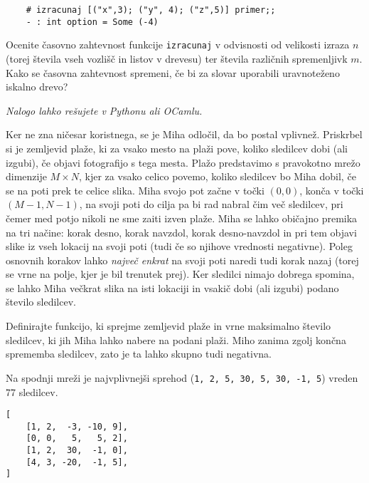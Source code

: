 \documentclass[arhiv]{../izpit}
\begin{document}
\begin{verbatim}
    # izracunaj [("x",3); ("y", 4); ("z",5)] primer;;
    - : int option = Some (-4)
\end{verbatim}

\podnaloga
Ocenite časovno zahtevnost funkcije \verb|izracunaj| v odvisnosti od velikosti izraza $n$ (torej števila vseh vozlišč in listov v drevesu) ter števila različnih spremenljivk $m$.
Kako se časovna zahtevnost spremeni, če bi za slovar uporabili uravnoteženo iskalno drevo?

  \naloga
  
  \emph{Nalogo lahko rešujete v Pythonu ali OCamlu.}


Ker ne zna ničesar koristnega, se je Miha odločil, da bo postal vplivnež. Priskrbel si je zemljevid plaže, ki za vsako mesto na plaži
pove, koliko sledilcev dobi (ali izgubi), če objavi fotografijo s tega mesta. 
Plažo predstavimo s pravokotno mrežo dimenzije $M \times N$, kjer za vsako celico povemo, koliko sledilcev bo Miha dobil,
če se na poti prek te celice slika.
Miha svojo pot začne v točki $(0, 0)$, konča v točki $(M-1, N-1)$, na svoji poti do cilja pa bi rad nabral čim več sledilcev, 
pri čemer med potjo nikoli ne sme zaiti izven plaže.
Miha se lahko običajno premika na tri načine: korak desno, korak navzdol, korak desno-navzdol in pri tem objavi slike iz vseh lokacij
na svoji poti (tudi če so njihove vrednosti negativne). Poleg osnovnih korakov lahko \emph{največ enkrat} na svoji poti naredi tudi 
korak nazaj (torej se vrne na polje, kjer je bil trenutek prej). Ker sledilci nimajo dobrega spomina, se lahko Miha večkrat slika na isti lokaciji in vsakič dobi (ali izgubi) 
podano število sledilcev.

Definirajte funkcijo, ki sprejme zemljevid plaže in vrne maksimalno število sledilcev, ki jih Miha lahko nabere na podani plaži.
Miho zanima zgolj končna sprememba sledilcev, zato je ta lahko skupno tudi negativna.

Na spodnji mreži je najvplivnejši sprehod (\verb|1, 2, 5, 30, 5, 30, -1, 5|) vreden 77 sledilcev. 
\begin{verbatim}
[
    [1, 2,  -3, -10, 9],
    [0, 0,   5,   5, 2],
    [1, 2,  30,  -1, 0],
    [4, 3, -20,  -1, 5],
]
\end{verbatim}
\end{document}
